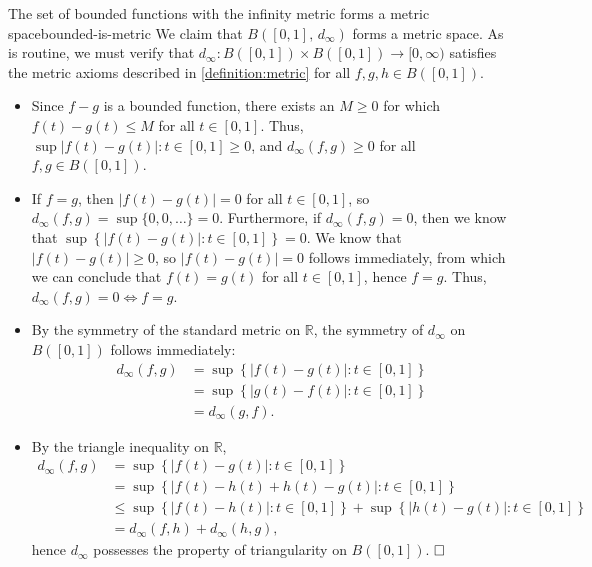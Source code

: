 \documentclass{article}
\renewcommand*\qedsymbol{\hfill\ensuremath{\Box}}
\numberwithin{equation}{section}
\begin{document}
\begin{theorem}{The set of bounded functions with the infinity metric forms a
        metric space}{bounded-is-metric}
    We claim that $ B([0, 1],\, d_\infty) $ forms a metric space. As is routine,
    we must verify that $ d_\infty : B([0, 1]) \times B([0, 1]) \to [0, \infty)
    $ satisfies the metric axioms described in \cref{definition:metric} for all
    $ f, g, h \in B([0, 1]) $.
    \begin{itemize}
        \item Since $ f-g $ is a bounded function, there exists an $ M \geq 0 $
            for which $ f(t) - g(t) \leq M $ for all $ t \in [0, 1] $. Thus,
            $ \sup{\vert f(t) - g(t) \vert \colon t \in [0, 1]} \geq 0 $, and
            $ d_\infty(f, g) \geq 0 $ for all $ f, g \in B([0, 1]) $.
        \item If $ f = g $, then $ \vert f(t) - g(t) \vert = 0 $ for all $ t \in
            [0, 1] $, so $ d_\infty(f, g) = \sup\{0, 0, \ldots\} = 0 $.
            Furthermore, if $ d_\infty(f, g) = 0 $, then we know that $
            \sup\left\{ \vert f(t) - g(t) \vert \colon t \in [0, 1] \right\} = 0
            $. We know that $ \vert f(t) - g(t) \vert \geq 0 $, so $ \vert f(t)
            - g(t) \vert = 0 $ follows immediately, from which we can conclude
            that $ f(t) = g(t) $ for all $ t \in [0, 1] $, hence $ f = g $.
            Thus, $ d_\infty(f, g) = 0 \iff f = g $.
        \item By the symmetry of the standard metric on $ \mathbb{R} $, the
            symmetry of $ d_\infty $ on $ B([0, 1]) $ follows immediately:
            \begin{align}
                d_\infty(f, g) &= \sup\left\{ \vert f(t) - g(t) \vert \colon
                    t \in [0, 1] \right\} \\
                &= \sup\left\{ \vert g(t) - f(t) \vert \colon t \in [0, 1]
                    \right\} \\
                &= d_\infty(g, f).
            \end{align}
        \item By the triangle inequality on $ \mathbb{R} $,
            \begin{align}
                d_\infty(f, g) &= \sup\left\{ \vert f(t) - g(t) \vert \colon
                    t \in [0, 1] \right\} \\
                &= \sup\left\{ \vert f(t) - h(t) + h(t) - g(t) \vert \colon
                    t \in [0, 1] \right\} \\
                &\leq \sup\left\{ \vert f(t) - h(t) \vert \colon t \in [0, 1]
                    \right\} + \sup\left\{ \vert h(t) - g(t) \vert \colon t \in
                    [0, 1] \right\} \\
                &= d_\infty(f, h) + d_\infty(h, g),
            \end{align}
            hence $ d_\infty $ possesses the property of triangularity on $
            B([0, 1]) $. $ \qedsymbol $
    \end{itemize}
\end{theorem}
\end{document}

